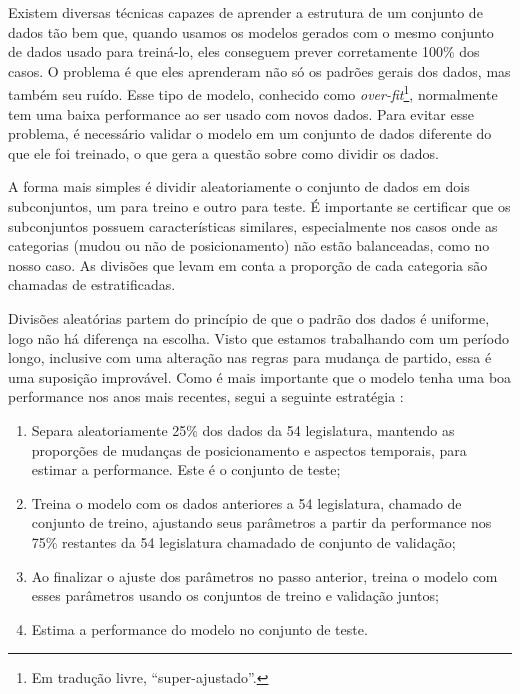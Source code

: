 \documentclass[a4paper,titlepage]{ppgi}\usepackage[]{graphicx}\usepackage[]{color}
\begin{document}



Existem diversas técnicas capazes de aprender a estrutura de um conjunto de
dados tão bem que, quando usamos os modelos gerados com o mesmo conjunto de
dados usado para treiná-lo, eles conseguem prever corretamente 100\% dos casos.
O problema é que eles aprenderam não só os padrões gerais dos dados, mas também
seu ruído. Esse tipo de modelo, conhecido como \emph{over-fit}\footnote{Em
tradução livre, ``super-ajustado''.}, normalmente tem uma baixa performance
ao ser usado com novos dados. Para evitar esse problema, é necessário validar o
modelo em um conjunto de dados diferente do que ele foi treinado, o que gera a
questão sobre como dividir os dados.

A forma mais simples é dividir aleatoriamente o conjunto de dados em dois
subconjuntos, um para treino e outro para teste. É importante se certificar que
os subconjuntos possuem características similares, especialmente nos casos onde
as categorias (mudou ou não de posicionamento) não estão balanceadas, como no
nosso caso. As divisões que levam em conta a proporção de cada categoria são
chamadas de estratificadas.

Divisões aleatórias partem do princípio de que o padrão dos dados é uniforme,
logo não há diferença na escolha. Visto que estamos trabalhando com um período
longo, inclusive com uma alteração nas regras para mudança de partido, essa é
uma suposição improvável. Como é mais importante que o modelo tenha uma boa
performance nos anos mais recentes, segui a seguinte estratégia
\cite[Capítulo~12.1]{Kuhn2013}:

\begin{enumerate}
\item Separa aleatoriamente 25\% dos dados da 54\textordfeminine{} legislatura,
mantendo as proporções de mudanças de posicionamento e aspectos temporais, para
estimar a performance. Este é o conjunto de teste;
\item Treina o modelo com os dados anteriores a 54\textordfeminine{}
legislatura, chamado de conjunto de treino, ajustando seus parâmetros a partir
da performance nos 75\% restantes da 54\textordfeminine{} legislatura chamadado
de conjunto de validação;
\item Ao finalizar o ajuste dos parâmetros no passo anterior, treina o modelo
com esses parâmetros usando os conjuntos de treino e validação juntos;
\item Estima a performance do modelo no conjunto de teste.
\end{enumerate}
\end{document}
